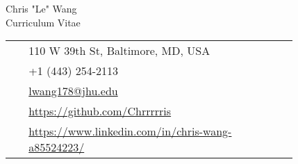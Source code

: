 \documentclass[10pt]{article} %
\begin{document}
\begin{paracol}{2}

\parbox[top][0.12\textheight][c]{\linewidth}{ %
	\vspace{-0.04\textheight} %
	\centering %
	{\sffamily\Huge Chris "Le" Wang}\\\medskip %
	{\Huge\color{headings} Curriculum Vitae}
}

\switchcolumn %

\parbox[top][0.12\textheight][c]{\linewidth}{ %
	\vspace{-0.04\textheight} %
	\colorbox{shade}{ %
		\begin{supertabular}{p{0.05\linewidth}|p{0.775\linewidth}} %
			\raisebox{-1pt}{\faHome} & 110 W 39th St, Baltimore, MD, USA \\ %
			\raisebox{-1pt}{\faPhone} & +1 (443) 254-2113 \\ %
			\raisebox{0pt}{\small\faEnvelope} & \href{mailto:lwang178@jhu.edu}{lwang178@jhu.edu} \\ %
			\raisebox{-1pt}{\faGithub} & \href{https://github.com/Chrrrrris}{https://github.com/Chrrrrris} \\ %
			\raisebox{-1pt}{\faLinkedinSquare} & \href{https://www.linkedin.com/in/chris-wang-a85524223/}{https://www.linkedin.com/in/chris-wang-a85524223/} \\ %
		\end{supertabular}
	}
}

\end{paracol}
\end{document}
